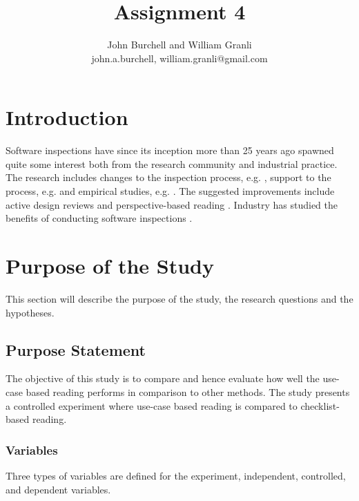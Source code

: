 \documentclass[10pt,twocolumn]{article}
\begin{document}
\title{Assignment 4}

\author{John Burchell and William Granli \\
john.a.burchell, william.granli@gmail.com}


\maketitle
\thispagestyle{empty}


\section{Introduction}
Software inspections have since its inception \cite{fagan2002design} more than
25 years ago spawned quite some interest both from the
research community and industrial practice. The research
includes changes to the inspection process, e.g. \cite{bisant1989two}, support to
the process, e.g. \cite{basili1996empirical} and empirical studies, e.g. \cite{basili1999building}. The
suggested improvements include active design reviews \cite{parnas1985active} and
perspective-based reading \cite{shull2000perspective}. Industry has studied the
benefits of conducting software inspections \cite{weller1993lessons}.

\section{Purpose of the Study}
This section will describe the purpose of the study, the research questions and the hypotheses. 

\subsection{Purpose Statement}
The objective of this study is to compare and hence
evaluate how well the use-case based reading performs in
comparison to other methods. The study presents a controlled
experiment where use-case based reading is compared to
checklist-based reading.

\subsubsection{Variables}
Three types of variables are defined for the experiment,
independent, controlled, and dependent variables.
\end{document}
